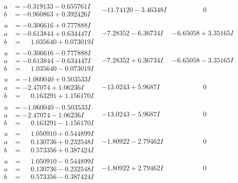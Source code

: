 \documentclass[1p]{elsarticle_modified}
\theoremstyle{definition}
\begin{document}
$$\begin{array}{c|c|c}
\begin{aligned}
a &= -0.319133 - 0.655761 I \\
b &= -0.960863 + 0.392426 I\end{aligned}
 & -11.74120 - 3.46348 I & \phantom{-0.000000 } 0 \\ \hline\begin{aligned}
u &= -0.306616 + 0.777888 I \\
a &= -0.613844 + 0.634447 I \\
b &= \phantom{-}1.035640 + 0.073019 I\end{aligned}
 & -7.28352 - 6.36734 I & -6.65058 + 3.35165 I \\ \hline\begin{aligned}
u &= -0.306616 - 0.777888 I \\
a &= -0.613844 - 0.634447 I \\
b &= \phantom{-}1.035640 - 0.073019 I\end{aligned}
 & -7.28352 + 6.36734 I & -6.65058 - 3.35165 I \\ \hline\begin{aligned}
u &= -1.060040 + 0.503533 I \\
a &= -2.47074 + 1.06236 I \\
b &= \phantom{-}0.163291 + 1.156170 I\end{aligned}
 & -13.0243 + 5.9687 I & \phantom{-0.000000 } 0 \\ \hline\begin{aligned}
u &= -1.060040 - 0.503533 I \\
a &= -2.47074 - 1.06236 I \\
b &= \phantom{-}0.163291 - 1.156170 I\end{aligned}
 & -13.0243 - 5.9687 I & \phantom{-0.000000 } 0 \\ \hline\begin{aligned}
u &= \phantom{-}1.050910 + 0.544899 I \\
a &= \phantom{-}0.130736 + 0.232548 I \\
b &= \phantom{-}0.573356 + 0.387424 I\end{aligned}
 & -1.80922 - 2.79462 I & \phantom{-0.000000 } 0 \\ \hline\begin{aligned}
u &= \phantom{-}1.050910 - 0.544899 I \\
a &= \phantom{-}0.130736 - 0.232548 I \\
b &= \phantom{-}0.573356 - 0.387424 I\end{aligned}
 & -1.80922 + 2.79462 I & \phantom{-0.000000 } 0 \\ \hline\begin{aligned}

\end{aligned}
\end{array}$$
\end{document}
